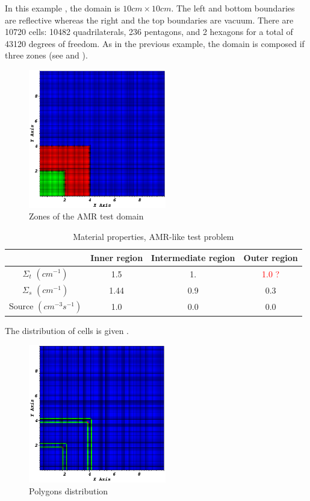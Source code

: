 In this example \cite{mip}, the domain is $10cm\times 10cm$. The left and bottom
boundaries are reflective whereas the right and the top boundaries are vacuum. 
There are 10720 cells: 10482 quadrilaterals, 236 pentagons,
and 2 hexagons for a total of 43120 degrees of freedom. 
As in the previous example, the domain is composed if three zones (see
 and ).
\begin{figure}[H]
  \centering
  \includegraphics[width=6cm]{zone_amr}
  \caption{Zones of the AMR test domain}
  \label{zone_amr}
\end{figure}
\begin{table}
  \begin{center}
    \caption{Material properties, AMR-like test problem}
    \begin{tabular}{|c|c|c|c|}
      \hline
      & Inner region & Intermediate region & Outer region  \\ \hline
    $\Sigma_t$ $(cm^{-1})$ & 1.5  & 1.  & \textcolor{red}{1.0 ?} \\
    $\Sigma_s$ $(cm^{-1})$ & 1.44 & 0.9 & 0.3 \\
  Source $(cm^{-3}s^{-1})$ & 1.0  & 0.0 & 0.0 \\
      \hline
    \end{tabular}
    \label{prop_amr}
  \end{center}
\end{table}
The distribution of cells is given .
\begin{figure}[H]
  \centering
  \includegraphics[width=6cm]{polygon_amr}
  \caption{Polygons distribution}
  \label{fig_pol_dist}
\end{figure}

